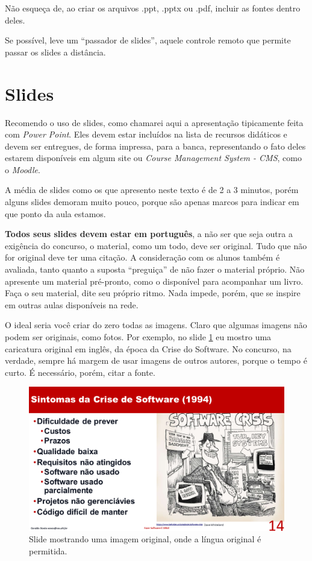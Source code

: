 \documentclass{article}
\def\tam{0.6}
\begin{document}
Não esqueça de, ao criar os arquivos .ppt, .pptx ou .pdf, incluir as fontes dentro deles.

Se possível, leve um ``passador de slides'', aquele controle remoto que permite passar os slides a distância.

\section{Slides}

Recomendo o uso de slides, como chamarei aqui a apresentação tipicamente feita com \textit{Power Point}. Eles devem estar incluídos na lista de recursos didáticos e devem ser entregues, de forma impressa, para a banca, representando o fato deles estarem disponíveis em algum site ou \textit{Course Management System - CMS}, como o \textit{Moodle}.

A média de slides como os que apresento neste texto é de 2 a 3 minutos, porém alguns slides demoram muito pouco, porque são apenas marcos para indicar em que ponto da aula estamos.

\textbf{Todos seus slides devem estar em português}, a não ser que seja outra a exigência do concurso, o material, como um todo, deve ser original. Tudo que não for original deve ter uma citação. A consideração com os alunos também é avaliada, tanto quanto a suposta ``preguiça'' de não fazer o material próprio. Não apresente um material pré-pronto, como o disponível para acompanhar um livro. Faça o seu material, dite seu próprio ritmo. Nada impede, porém, que se inspire em outras aulas disponíveis na rede.

O ideal seria você criar do zero todas as imagens. Claro que algumas imagens não podem ser originais, como fotos. Por exemplo, no slide \ref{fig:crisis} eu mostro uma caricatura original em inglês, da época da Crise do Software. No concurso, na verdade, sempre há  margem de usar imagens de outros autores, porque o tempo é curto. É necessário, porém, citar a fonte.

\begin{figure}[!htb]
    \centering
    \includegraphics[width=\tam\linewidth]{imagens/crisis.png}
    \caption{Slide mostrando uma imagem original, onde a língua original é permitida.}
    \label{fig:crisis}
\end{figure}
\end{document}
